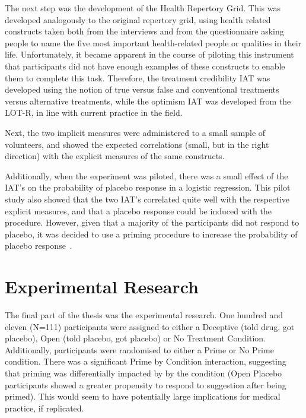 The next step was the development of the Health Repertory Grid. This was developed analogously to the original repertory grid, using health related constructs taken both from the interviews and from the questionnaire asking people to name the five most important health-related people or qualities in their life. Unfortunately, it became apparent in the course of piloting this instrument that participants did not have enough examples of these constructs to enable them to complete this task. Therefore, the treatment credibility IAT was developed using the notion of true versus false and conventional treatments versus alternative treatments, while the optimism IAT was developed from the LOT-R, in line with current practice in the field. 

Next, the two implicit measures were administered to a small sample of volunteers, and showed the expected correlations (small, but in the right direction) with the explicit measures of the same constructs. 

Additionally, when the experiment was piloted, there was a small effect of the IAT's on the probability of placebo response in a logistic regression. 
This pilot study also showed that the two IAT's correlated quite well with the respective explicit measures, and that a placebo response could be induced with the procedure. However, given that a majority of the participants did not respond to placebo, it was decided to use a priming procedure to increase the probability of placebo response~\cite{Geers2005a}. 

\section{Experimental Research}
\label{sec:exper-rese}

The final part of the thesis was the experimental research. One hundred and eleven (N=111) participants were assigned to either a Deceptive (told drug, got placebo), Open (told placebo, got placebo) or No Treatment Condition. Additionally, participants were randomised to either a Prime or No Prime condition. %
There was a significant Prime by Condition interaction, suggesting that priming was differentially impacted by by the condition (Open Placebo participants showed a greater propensity to respond to suggestion after being primed). This would seem to have potentially large implications for medical practice, if replicated. 

